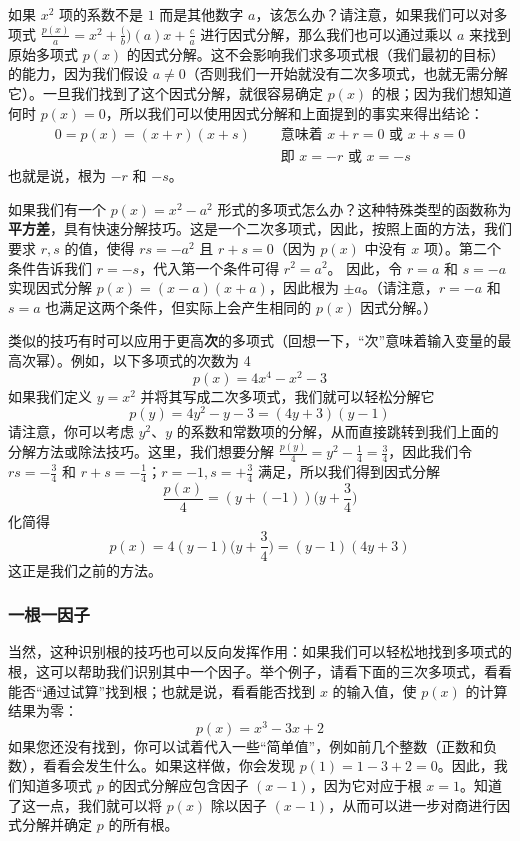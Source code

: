 如果 $x^2$ 项的系数不是 $1$ 而是其他数字 $a$，该怎么办？请注意，如果我们可以对多项式 $\frac{p(x)}{a} = x^2+\frac(b)(a)x+\frac{c}{a}$ 进行因式分解，那么我们也可以通过乘以 $a$ 来找到原始多项式 $p(x)$ 的因式分解。这不会影响我们求多项式根（我们最初的目标）的能力，因为我们假设 $a \ne 0$（否则我们一开始就没有二次多项式，也就无需分解它）。一旦我们找到了这个因式分解，就很容易确定 $p(x)$ 的根；因为我们想知道何时 $p(x) = 0$，所以我们可以使用因式分解和上面提到的事实来得出结论：
\begin{align*}
    0 = p(x) = (x + r)(x + s) & \quad \text{ 意味着 } x + r = 0 \text{ 或 } x + s = 0 \\
    & \quad \text{ 即 } x = -r \text{ 或 } x = -s
\end{align*}
也就是说，根为 $-r$ 和 $-s$。

如果我们有一个 $p(x) = x^2 - a^2$ 形式的多项式怎么办？这种特殊类型的函数称为\textbf{平方差}，具有快速分解技巧。这是一个二次多项式，因此，按照上面的方法，我们要求 $r,s$ 的值，使得 $rs = -a^2$ 且 $r + s = 0$（因为 $p(x)$ 中没有 $x$ 项）。第二个条件告诉我们 $r = -s$，代入第一个条件可得 $r^2 = a^2$。 因此，令 $r = a$ 和 $s = -a$ 实现因式分解 $p(x) = (x - a)(x + a)$，因此根为 $\pm a$。（请注意，$r = -a$ 和 $s = a$ 也满足这两个条件，但实际上会产生相同的 $p(x)$ 因式分解。）

类似的技巧有时可以应用于更高\textbf{次}的多项式（回想一下，“次”意味着输入变量的最高次幂）。例如，以下多项式的次数为 4
\[p(x) = 4x^4 - x^2 - 3\]
如果我们定义 $y = x^2$ 并将其写成二次多项式，我们就可以轻松分解它
\[p(y) = 4y^2 - y - 3 = (4y + 3)(y - 1)\]
请注意，你可以考虑 $y^2$、$y$ 的系数和常数项的分解，从而直接跳转到我们上面的分解方法或除法技巧。这里，我们想要分解 $\frac{p(y)}{4} = y^2-\frac{1}{4}=\frac{3}{4}$，因此我们令 $rs = -\frac{3}{4}$ 和 $r + s =-\frac{1}{4}$；$r=-1, s=+\frac{3}{4}$ 满足，所以我们得到因式分解
\[\frac{p(x)}{4} = (y+(-1))\Big(y+\frac{3}{4}\Big)\]
化简得
\[p(x) = 4(y-1)\Big(y+\frac{3}{4}\Big) = (y-1)(4y+3)\]
这正是我们之前的方法。

\subsubsection*{一根一因子}

当然，这种识别根的技巧也可以反向发挥作用：如果我们可以轻松地找到多项式的根，这可以帮助我们识别其中一个因子。举个例子，请看下面的三次多项式，看看能否“通过试算”找到根；也就是说，看看能否找到 $x$ 的输入值，使 $p(x)$ 的计算结果为零：
\[p(x) = x^3 - 3x + 2\]
如果您还没有找到，你可以试着代入一些“简单值”，例如前几个整数（正数和负数），看看会发生什么。如果这样做，你会发现 $p(1) = 1 - 3 + 2 = 0$。因此，我们知道多项式 $p$ 的因式分解应包含因子 $(x - 1)$，因为它对应于根 $x = 1$。知道了这一点，我们就可以将 $p(x)$ 除以因子 $(x - 1)$，从而可以进一步对商进行因式分解并确定 $p$ 的所有根。

